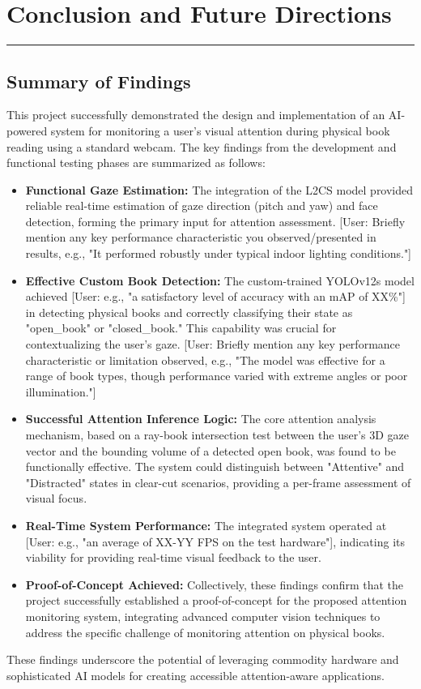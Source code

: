 \chapter{Conclusion and Future Directions}
\vspace{-1.5cm}
\hspace{-1cm}\rule{19cm}{0.4pt} 

\section{Summary of Findings}
This project successfully demonstrated the design and implementation of an AI-powered system for monitoring a user's visual attention during physical book reading using a standard webcam. The key findings from the development and functional testing phases are summarized as follows:
\begin{itemize}
    \item \textbf{Functional Gaze Estimation:} The integration of the L2CS model provided reliable real-time estimation of gaze direction (pitch and yaw) and face detection, forming the primary input for attention assessment. [User: Briefly mention any key performance characteristic you observed/presented in results, e.g., "It performed robustly under typical indoor lighting conditions."]
    \item \textbf{Effective Custom Book Detection:} The custom-trained YOLOv12s model achieved [User: e.g., "a satisfactory level of accuracy with an mAP of XX\%"] in detecting physical books and correctly classifying their state as "open\_book" or "closed\_book." This capability was crucial for contextualizing the user's gaze. [User: Briefly mention any key performance characteristic or limitation observed, e.g., "The model was effective for a range of book types, though performance varied with extreme angles or poor illumination."]
    \item \textbf{Successful Attention Inference Logic:} The core attention analysis mechanism, based on a ray-book intersection test between the user's 3D gaze vector and the bounding volume of a detected open book, was found to be functionally effective. The system could distinguish between "Attentive" and "Distracted" states in clear-cut scenarios, providing a per-frame assessment of visual focus.
    \item \textbf{Real-Time System Performance:} The integrated system operated at [User: e.g., "an average of XX-YY FPS on the test hardware"], indicating its viability for providing real-time visual feedback to the user.
    \item \textbf{Proof-of-Concept Achieved:} Collectively, these findings confirm that the project successfully established a proof-of-concept for the proposed attention monitoring system, integrating advanced computer vision techniques to address the specific challenge of monitoring attention on physical books.
\end{itemize}
These findings underscore the potential of leveraging commodity hardware and sophisticated AI models for creating accessible attention-aware applications.

